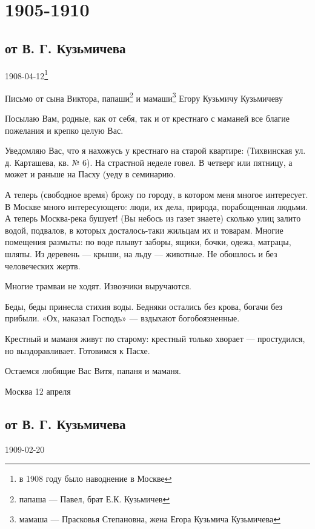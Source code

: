 \documentclass[]{memoir}
\begin{document}
\chapter{1905-1910}

\section{от В. Г. Кузьмичева}
{1908-04-12\footnote{в 1908 году было наводнение в Москве}}

Письмо от сына Виктора, папаши\footnote{папаша — Павел, брат Е.К. Кузьмичев} и мамаши\footnote{мамаша — Прасковья Степановна, жена Егора Кузьмича Кузьмичева} Егору Кузьмичу Кузьмичеву



Посылаю Вам, родные, как от себя, так и от крестнаго с маманей все благие пожелания и крепко целую Вас.

Уведомляю Вас, что я нахожусь у крестнаго на старой квартире: (Тихвинская ул. д. Карташева, кв. № 6). На страстной неделе говел. В четверг или пятницу, а может и раньше на  Пасху (уеду в семинарию. 

А теперь (свободное время) брожу по городу, в котором меня многое интересует. В Москве много интересующего: люди, их дела, природа, порабощенная людьми. А теперь Москва-река бушует! (Вы небось из газет знаете) сколько улиц залито водой, подвалов, в которых  досталось-таки жильцам их и товарам. Многие помещения размыты: по воде плывут заборы, ящики, бочки, одежа, матрацы, шляпы. Из деревень — крыши, на льду — животные. Не обошлось и без человеческих жертв. 

Многие трамваи не ходят. Извозчики выручаются. 

Беды, беды принесла стихия воды. Бедняки остались без крова, богачи без прибыли. 
«Ох, наказал Господь» — вздыхают богобоязненные.

Крестный и маманя живут по старому: крестный только хворает — простудился, но выздоравливает. Готовимся к Пасхе. 

Остаемся любящие Вас Витя, папаня и маманя.

Москва 12 апреля 


\section{от В. Г. Кузьмичева}
{1909-02-20}
\end{document}

